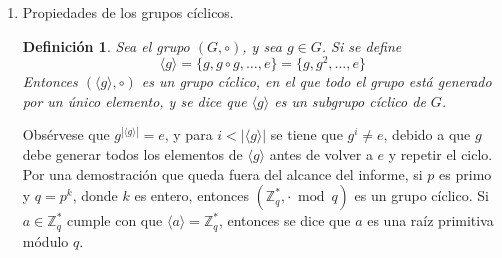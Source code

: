 \documentclass[hidelinks, 12pt]{article}
\newcommand{\Zs}{\mathbb{Z}^*}
\newtheorem*{definition}{Definición}
\begin{document}
\begin{enumerate}
\begin{proof}
        En primer lugar, obsérvese que 
        \[h=f(g)=f(g)\ast e_H=f(g)\ast f(e_i)=f(g\circ e_i),~i=1,\dots,n\]
        Entonces, $g\circ e_i\in f^{-1}(h)$, y como la igualdad planteada encima se cumple para todos los $e_i\in K$, entonces $g\circ e_1,\dots,g\circ e_n\in f^{-1}(h)$, y por lo tanto $g\circ K\subseteq f^{-1}(h)$.

        En segundo lugar, sea $g'\in f^{-1}(h)$. Entonces:
        \begin{align*}
            \qquad\qquad\qquad&g'=e_G\circ g'=(g\circ g^{-1})\circ g'=g\circ(g^{-1}\circ g')&&\big{/}f(~)\\
            f(&g')=f(g\circ(g^{-1}\circ g'))=f(g)\ast f(g^{-1}\circ g') \\
            &h=h\ast f(g^{-1}\circ g')&&\big{/}h^{-1}\ast \\
            &e_H=e_H\ast f(g^{-1}\circ g')=f(g^{-1}\circ g')
        \end{align*}
        Por lo que $g^{-1}\circ g'\in K$, y si se define $c=g^{-1}\circ g'$, se obtiene que $g'=g\circ c$ para un $c\in K$. Esto significa que $g'\in g\circ K$, lo que implica que $f^{-1}(h)\subseteq g\circ K$.

        Debido a que $f^{-1}(h)\subseteq g\circ K$ y $f^{-1}(h)\supseteq g\circ K$, se comprueba que $f^{-1}(h)=g\circ K$, y por lo tanto $|f^{-1}(h)|=|g\circ K|=|K|$. Entonces, se concluye que para todo par $h_1,h_2\in H$, se cumple que
        \[|f^{-1}(h_1)|=|K|=|f^{-1}(h_2)|\]
    \end{proof}

    \newpage
    \item Propiedades de los grupos cíclicos. \\
    \begin{definition}
        Sea el grupo $(G,\circ)$, y sea $g\in G$. Si se define
        \[\langle g\rangle=\{g,g\circ g,\dots,e\}=\{g,g^2,\dots,e\}\]
        Entonces $(\langle g\rangle,\circ)$ es un grupo cíclico, en el que todo el grupo está generado por un único elemento, y se dice que $\langle g\rangle$ es un subgrupo cíclico de $G$.
    \end{definition}

    Obsérvese que $g^{|\langle g\rangle|}=e$, y para $i<|\langle g\rangle|$ se tiene que $g^i\neq e$, debido a que $g$ debe generar todos los elementos de $\langle g\rangle$ antes de volver a $e$ y repetir el ciclo. Por una demostración que queda fuera del alcance del informe, si $p$ es primo y $q=p^k$, donde $k$ es entero, entonces $(\Zs_q,\cdot\bmod q)$ es un grupo cíclico. Si $a\in\Zs_q$ cumple con que $\langle a\rangle=\Zs_q$, entonces se dice que $a$ es una raíz primitiva módulo $q$.


\end{enumerate}
\end{document}
